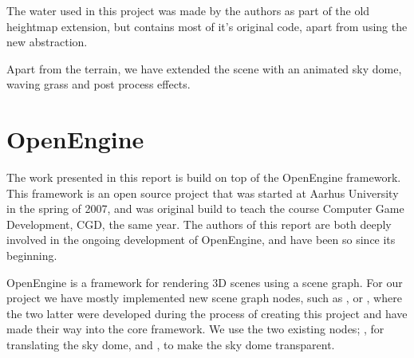 The water used in this project was made by the authors as part of
the old heightmap extension, but contains most of it's original code,
apart from using the new  abstraction.

Apart from the terrain, we have extended the scene with an
animated sky dome, waving grass and post process effects.



\section{OpenEngine}
The work presented in this report is build on top of the OpenEngine
framework. This framework is an open source project that was started
at Aarhus University in the spring of 2007, and was original build to
teach the course Computer Game Development, CGD, the same year. The
authors of this report are both deeply involved in the ongoing
development of OpenEngine, and have been so since its beginning.

OpenEngine is a framework for rendering 3D scenes using a scene graph.
For our project we have mostly implemented new scene graph nodes, such
as ,  or ,
where the two latter were developed during the process of creating
this project and have made their way into the core framework. We use
the two existing nodes; , for translating
the sky dome, and , to make the sky dome transparent.\\

